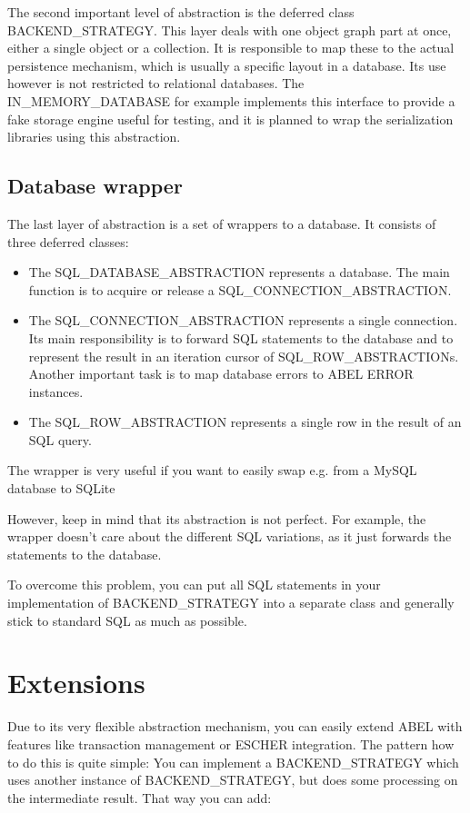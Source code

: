 The second important level of abstraction is the deferred class BACKEND\_STRATEGY.
This layer deals with one object graph part at once, either a single object or a collection.
It is responsible to map these to the actual persistence mechanism, which is usually a specific layout in a database.
Its use however is not restricted to relational databases.
The IN\_MEMORY\_DATABASE for example implements this interface to provide a fake storage engine useful for testing, and it is planned to wrap the serialization libraries using this abstraction.

\subsection{Database wrapper}


The last layer of abstraction is a set of wrappers to a database. 
It consists of three deferred classes: 
\begin{itemize}
 \item The SQL\_DATABASE\_ABSTRACTION represents a database. The main function is to acquire or release a SQL\_CONNECTION\_ABSTRACTION.
 \item The SQL\_CONNECTION\_ABSTRACTION represents a single connection. 
Its main responsibility is to forward SQL statements to the database and to represent the result in an iteration cursor of SQL\_ROW\_ABSTRACTIONs.
Another important task is to map database errors to ABEL ERROR instances.
  \item The SQL\_ROW\_ABSTRACTION represents a single row in the result of an SQL query.
\end{itemize}

The wrapper is very useful if you want to easily swap e.g. from a MySQL database to SQLite

However, keep in mind that its abstraction is not perfect. 
For example, the wrapper doesn't care about the different SQL variations, as it just forwards the statements to the database.

To overcome this problem, you can put all SQL statements in your implementation of BACKEND\_STRATEGY into a separate class and generally stick to standard SQL as much as possible.


\section{Extensions}

Due to its very flexible abstraction mechanism, you can easily extend ABEL with features like transaction management or ESCHER  integration.
The pattern how to do this is quite simple: 
You can implement a BACKEND\_STRATEGY which uses another instance of BACKEND\_STRATEGY, but does some processing on the intermediate result.
That way you can add:

